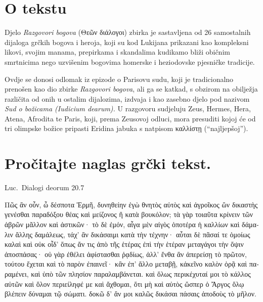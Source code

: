 


\section*{O tekstu}

Djelo \textit{Razgovori bogova} \textgreek[variant=ancient]{(Θεῶν διάλογοι)} zbirka je sastavljena od 26 samostalnih dijaloga grčkih bogova i heroja, koji su kod Lukijana prikazani kao kompleksni likovi, svojim manama, prepirkama i skandalima kudikamo bliži običnim smrtnicima nego uzvišenim bogovima homerske i heziodovske pjesničke tradicije. 

Ovdje se donosi odlomak iz epizode o Parisovu sudu, koji je tradicionalno prenošen kao dio zbirke \textit{Razgovori bogova}, ali ga se katkad, s obzirom na obilježja različita od onih u ostalim dijalozima, izdvaja i kao zasebno djelo pod nazivom \textit{Sud o božicama (Iudicium dearum).} U razgovoru sudjeluju Zeus, Hermes, Hera, Atena, Afrodita te Paris, koji, prema Zeusovoj odluci, mora presuditi kojoj će od tri olimpske božice pripasti Eridina jabuka s natpisom \textgreek[variant=ancient]{καλλίστῃ} (``najljepšoj'').


\section*{Pročitajte naglas grčki tekst.}


Luc.\ Dialogi deorum 20.7

\medskip

{\large
\begin{greek}
\noindent Πῶς ἂν οὖν, ὦ δέσποτα  Ἑρμῆ, δυνηθείην ἐγὼ θνητὸς αὐτὸς καὶ ἀγροῖκος ὢν δικαστὴς γενέσθαι παραδόξου θέας καὶ μείζονος ἢ κατὰ βουκόλον; τὰ γὰρ τοιαῦτα κρίνειν τῶν ἁβρῶν μᾶλλον καὶ ἀστικῶν· τὸ δὲ ἐμόν, αἶγα μὲν αἰγὸς ὁποτέρα ἡ καλλίων καὶ δάμαλιν ἄλλης δαμάλεως, τάχ' ἂν δικάσαιμι κατὰ τὴν τέχνην· αὗται δὲ πᾶσαί τε ὁμοίως καλαὶ καὶ οὐκ οἶδ' ὅπως ἄν τις ἀπὸ τῆς ἑτέρας ἐπὶ τὴν ἑτέραν μεταγάγοι τὴν ὄψιν ἀποσπάσας· οὐ γὰρ ἐθέλει ἀφίστασθαι ῥᾳδίως, ἀλλ' ἔνθα ἂν ἀπερείσῃ τὸ πρῶτον, τούτου ἔχεται καὶ τὸ παρὸν ἐπαινεῖ· κἂν ἐπ' ἄλλο μεταβῇ, κἀκεῖνο καλὸν ὁρᾷ καὶ παραμένει, καὶ ὑπὸ τῶν πλησίον παραλαμβάνεται. καὶ ὅλως περικέχυταί μοι τὸ κάλλος αὐτῶν καὶ ὅλον περιείληφέ με καὶ ἄχθομαι, ὅτι μὴ καὶ αὐτὸς ὥσπερ ὁ Ἄργος ὅλῳ βλέπειν δύναμαι τῷ σώματι. δοκῶ δ' ἄν μοι καλῶς δικάσαι πάσαις ἀποδοὺς τὸ μῆλον.

\end{greek}

}

